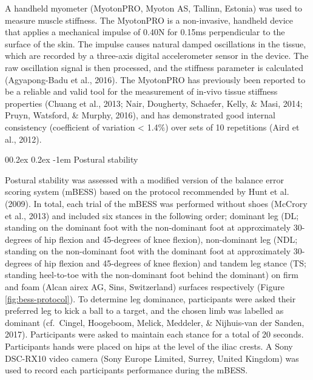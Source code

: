 \documentclass[
  english,
  man,floatsintext]{apa6}
\makeatletter
\renewcommand{\paragraph}{\@startsection{paragraph}{4}{\parindent}%
  {0\baselineskip \@plus 0.2ex \@minus 0.2ex}%
  {-1em}%
  {\normalfont\normalsize\bfseries\itshape\typesectitle}}
\makeatother
\begin{document}
A handheld myometer (MyotonPRO, Myoton AS, Tallinn, Estonia) was used to measure muscle stiffness.
The MyotonPRO is a non-invasive, handheld device that applies a mechanical impulse of 0.40N for 0.15ms perpendicular to the surface of the skin.
The impulse causes natural damped oscillations in the tissue, which are recorded by a three-axis digital accelerometer sensor in the device.
The raw oscillation signal is then processed, and the stiffness parameter is calculated (Agyapong-Badu et al., 2016).
The MyotonPRO has previously been reported to be a reliable and valid tool for the measurement of in-vivo tissue stiffness properties (Chuang et al., 2013; Nair, Dougherty, Schaefer, Kelly, \& Masi, 2014; Pruyn, Watsford, \& Murphy, 2016), and has demonstrated good internal consistency (coefficient of variation \textless{} 1.4\%) over sets of 10 repetitions (Aird et al., 2012).

\hypertarget{postural-stability}{%
\paragraph{Postural stability}\label{postural-stability}}

Postural stability was assessed with a modified version of the balance error scoring system (mBESS) based on the protocol recommended by Hunt et al. (2009).
In total, each trial of the mBESS was performed without shoes (McCrory et al., 2013) and included six stances in the following order; dominant leg (DL; standing on the dominant foot with the non-dominant foot at approximately 30-degrees of hip flexion and 45-degrees of knee flexion),
non-dominant leg (NDL; standing on the non-dominant foot with the dominant foot at approximately 30-degrees of hip flexion and 45-degrees of knee flexion)
and tandem leg stance (TS; standing heel-to-toe with the non-dominant foot behind the dominant) on firm and foam (Alcan airex AG, Sins, Switzerland) surfaces respectively (Figure \ref{fig:bess-protocol}).
To determine leg dominance, participants were asked their preferred leg to kick a ball to a target, and the chosen limb was labelled as dominant (cf.~Cingel, Hoogeboom, Melick, Meddeler, \& Nijhuis-van der Sanden, 2017).
Participants were asked to maintain each stance for a total of 20 seconds.
Participants hands were placed on hips at the level of the iliac crests.
A Sony DSC-RX10 video camera (Sony Europe Limited, Surrey, United Kingdom) was used to record each participants performance during the mBESS.
\end{document}
